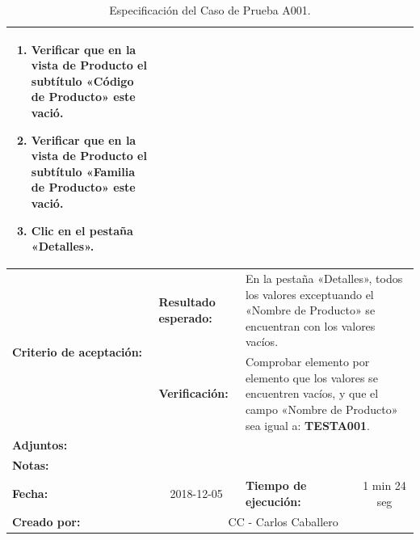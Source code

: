 \begin{table}[H]
\begin{tabular}{|p{2.5cm}|p{2.8cm}|p{2.2cm}|p{2.8cm}|p{2.2cm}|}
{{\begin{enumerate}
\item Verificar que en la vista de Producto el subtítulo «Código de Producto» este vació.
\item Verificar que en la vista de Producto el subtítulo «Familia de Producto» este vació.
\item Clic en el pestaña «Detalles».
\end{enumerate}
}} \\
\hline
\multirow{2}{2.8cm}{\footnotesize{\textbf{Criterio de aceptación:}}} &
\footnotesize{\textbf{Resultado esperado:}} &
\multicolumn{3}{p{9.1cm}|}{\footnotesize{En la pestaña «Detalles», todos los
valores exceptuando el «Nombre de Producto» se encuentran con los valores
vacíos.}} \\
\cline{2-5}
& \footnotesize{\textbf{Verificación:}} &
\multicolumn{3}{p{9.1cm}|}{\footnotesize{Comprobar elemento por elemento que los
valores se encuentren vacíos, y que el campo «Nombre de Producto» sea igual a:
\textbf{TESTA001}.}} \\
\hline
\footnotesize{\textbf{Adjuntos:}} &
\multicolumn{4}{p{12.4cm}|}{\footnotesize{}} \\
\hline
\footnotesize{\textbf{Notas:}} &
\multicolumn{4}{p{12.4cm}|}{\footnotesize{}} \\
\hline
\footnotesize{\textbf{Fecha:}} &
\multicolumn{1}{c|}{\footnotesize{2018-12-05}} &
\multicolumn{2}{l|}{\footnotesize{\textbf{Tiempo de ejecución:}}} &
\multicolumn{1}{c|}{\footnotesize{1 min 24 seg}} \\
\hline
\footnotesize{\textbf{Creado por:}} &
\multicolumn{4}{c|}{\footnotesize{CC - Carlos Caballero}} \\
\hline
\end{tabular}
\caption{Especificación del Caso de Prueba A001.}
\label{lltc}
\end{table}

